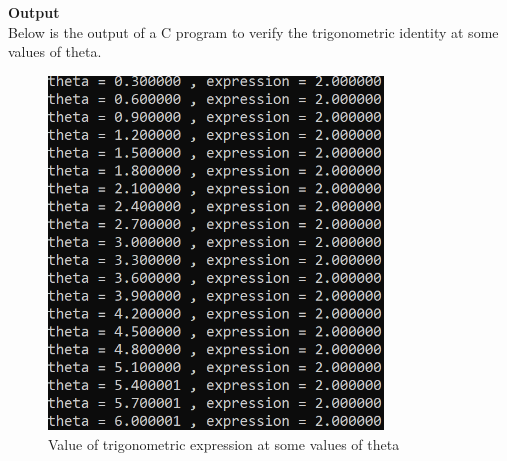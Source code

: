 \documentclass[journal,12pt,twocolumn]{IEEEtran}
\begin{document}
\textbf{\Large{Output}}\\[.1in]
Below is the output of a C program to verify the trigonometric identity at some values of theta.\\
\begin{figure}[H]
\includegraphics[width=3.5in]{fig.png}
\caption{Value of trigonometric expression at some values of theta}
\end{figure}
\end{document}
